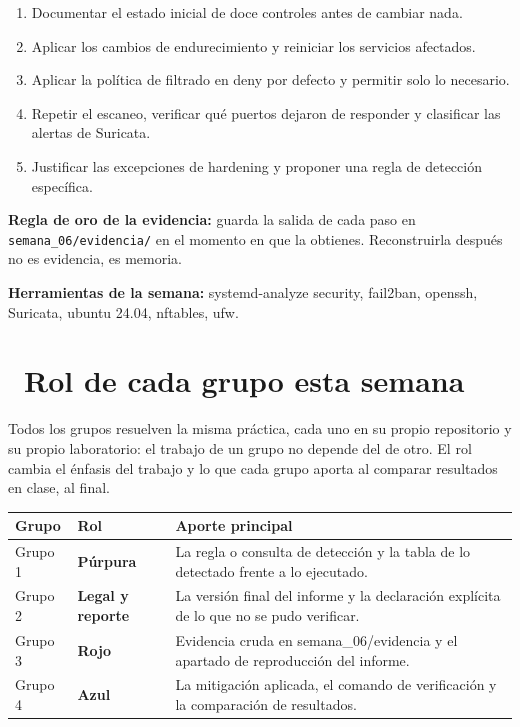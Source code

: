 \documentclass[11pt,a4paper]{article}
\newcommand{\iconotexto}[2]{\textcolor{cyanNeon}{\faIcon{#1}}~#2}
\begin{document}
\begin{enumerate}[leftmargin=1.4em,itemsep=2pt,topsep=3pt]
  \item Documentar el estado inicial de doce controles antes de cambiar nada.
  \item Aplicar los cambios de endurecimiento y reiniciar los servicios afectados.
  \item Aplicar la política de filtrado en deny por defecto y permitir solo lo necesario.
  \item Repetir el escaneo, verificar qué puertos dejaron de responder y clasificar las alertas de Suricata.
  \item Justificar las excepciones de hardening y proponer una regla de detección específica.
\end{enumerate}

\begin{cajaConcepto}\textbf{Regla de oro de la evidencia:} guarda la salida de cada paso en \texttt{semana\_06/evidencia/} en el momento en que la obtienes. Reconstruirla después no es evidencia, es memoria.
\end{cajaConcepto}

\textbf{Herramientas de la semana:} systemd-analyze security, fail2ban, openssh, Suricata, ubuntu 24.04, nftables, ufw.

\section{\iconotexto{users}{Rol de cada grupo esta semana}}

Todos los grupos resuelven la misma práctica, cada uno en su propio repositorio y su propio laboratorio: el trabajo de un grupo no depende del de otro. El rol cambia el énfasis del trabajo y lo que cada grupo aporta al comparar resultados en clase, al final.

\begin{tabularx}{\linewidth}{@{}l l X@{}}
\toprule
Grupo & Rol & Aporte principal\\
\midrule
Grupo 1 & \textbf{Púrpura} & La regla o consulta de detección y la tabla de lo detectado frente a lo ejecutado. \\
Grupo 2 & \textbf{Legal y reporte} & La versión final del informe y la declaración explícita de lo que no se pudo verificar. \\
Grupo 3 & \textbf{Rojo} & Evidencia cruda en semana\_06/evidencia y el apartado de reproducción del informe. \\
Grupo 4 & \textbf{Azul} & La mitigación aplicada, el comando de verificación y la comparación de resultados. \\
\bottomrule
\end{tabularx}
\end{document}

